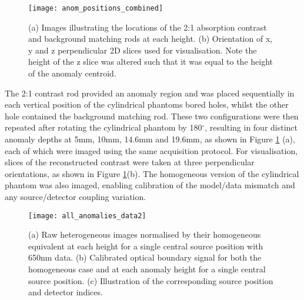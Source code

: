 \documentclass[twoside]{bhamthesis}
\theoremstyle{definition}
\begin{document}
\begin{figure}[!ht]
\centering
  \texttt{[image: anom\_positions\_combined]}
  \caption{(a) Images illustrating the locations of the 2:1 absorption contrast and background matching rods at each height. (b) Orientation of x, y and z perpendicular 2D slices used for visualisation. Note the height of the z slice was altered such that it was equal to the height of the anomaly centroid.}
  \label{fig:anom_positions_combined}
\end{figure}

The 2:1 contrast rod provided an anomaly region and was placed sequentially in each vertical position of the cylindrical phantoms  bored holes, whilst the other hole contained the background matching rod. These two configurations were then repeated after rotating the cylindrical phantom by 180$^\circ$, resulting in four distinct anomaly depths at 5mm, 10mm, 14.6mm and 19.6mm, as shown in Figure \ref{fig:anom_positions_combined} (a), each of which were imaged using the same acquisition protocol. For visualisation, slices of the reconstructed contrast were taken at three perpendicular orientations, as shown in Figure \ref{fig:anom_positions_combined}(b). The homogeneous version of the cylindrical phantom was also imaged, enabling calibration of the model/data mismatch and any source/detector coupling variation. 


\begin{figure}[!ht]
\centering
  \texttt{[image: all\_anomalies\_data2]}
\caption{(a) Raw heterogeneous images normalised by their homogeneous equivalent at each height for a single central source position with 650nm data. (b) Calibrated optical boundary signal for both the homogeneous case and at each anomaly height for a single central source position. (c) Illustration of the corresponding source position and detector indices.}
  \label{fig:all_anomalies_data}
\end{figure}
\end{document}
